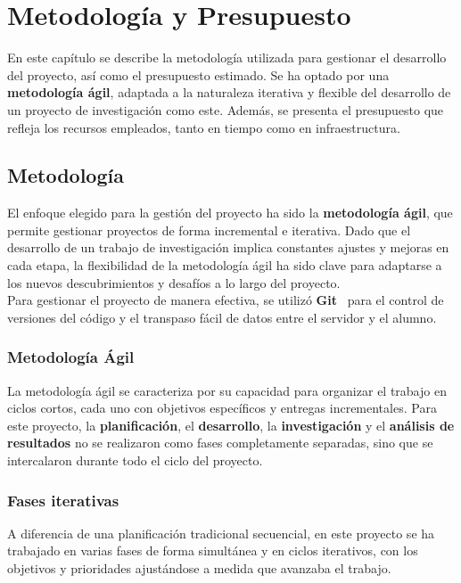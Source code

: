 \chapter{Metodología y Presupuesto}\label{ch:metodologia-y-presupuesto}
En este capítulo se describe la metodología utilizada para gestionar el desarrollo del proyecto, así como el
presupuesto estimado.
Se ha optado por una \textbf{metodología ágil}, adaptada a la naturaleza iterativa y flexible del desarrollo de un
proyecto de investigación como este.
Además, se presenta el presupuesto que refleja los recursos empleados, tanto en tiempo como en infraestructura.

\section{Metodología}\label{sec:metodologia}
El enfoque elegido para la gestión del proyecto ha sido la \textbf{metodología ágil}, que permite gestionar proyectos
de forma incremental e iterativa.
Dado que el desarrollo de un trabajo de investigación implica constantes ajustes y mejoras en cada etapa, la
flexibilidad de la metodología ágil ha sido clave para adaptarse a los nuevos descubrimientos y desafíos a lo largo del
proyecto. \\[6pt]

Para gestionar el proyecto de manera efectiva, se utilizó \textbf{Git}~\cite{} para el control de versiones del código
y el transpaso fácil de datos entre el servidor y el alumno.

\subsection{Metodología Ágil}\label{subsec:metodologia-agil}
La metodología ágil se caracteriza por su capacidad para organizar el trabajo en ciclos cortos, cada uno con
objetivos específicos y entregas incrementales.
Para este proyecto, la \textbf{planificación}, el \textbf{desarrollo}, la \textbf{investigación} y el
\textbf{análisis de resultados} no se realizaron como fases completamente separadas, sino que se intercalaron durante
todo el ciclo del proyecto.

\subsection{Fases iterativas}\label{subsec:fases-iterativas}
A diferencia de una planificación tradicional secuencial, en este proyecto se ha trabajado en varias fases de forma
simultánea y en ciclos iterativos, con los objetivos y prioridades ajustándose a medida que avanzaba el trabajo.

